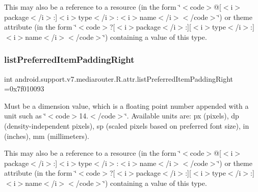 This may also be a reference to a resource (in the form \char`\"{}$<$code$>$@\mbox{[}$<$i$>$package$<$/i$>$\+:\mbox{]}$<$i$>$type$<$/i$>$\+:$<$i$>$name$<$/i$>$$<$/code$>$\char`\"{}) or theme attribute (in the form \char`\"{}$<$code$>$?\mbox{[}$<$i$>$package$<$/i$>$\+:\mbox{]}\mbox{[}$<$i$>$type$<$/i$>$\+:\mbox{]}$<$i$>$name$<$/i$>$$<$/code$>$\char`\"{}) containing a value of this type. \mbox{\label{classandroid_1_1support_1_1v7_1_1mediarouter_1_1R_1_1attr_ab8b4729519d0a70934dac6d8504e64cf}} 
\subsubsection{\texorpdfstring{list\+Preferred\+Item\+Padding\+Right}{listPreferredItemPaddingRight}}
{\footnotesize\ttfamily int android.\+support.\+v7.\+mediarouter.\+R.\+attr.\+list\+Preferred\+Item\+Padding\+Right =0x7f010093\hspace{0.3cm}{\ttfamily [static]}}

Must be a dimension value, which is a floating point number appended with a unit such as \char`\"{}$<$code$>$14.\+5sp$<$/code$>$\char`\"{}. Available units are\+: px (pixels), dp (density-\/independent pixels), sp (scaled pixels based on preferred font size), in (inches), mm (millimeters). 

This may also be a reference to a resource (in the form \char`\"{}$<$code$>$@\mbox{[}$<$i$>$package$<$/i$>$\+:\mbox{]}$<$i$>$type$<$/i$>$\+:$<$i$>$name$<$/i$>$$<$/code$>$\char`\"{}) or theme attribute (in the form \char`\"{}$<$code$>$?\mbox{[}$<$i$>$package$<$/i$>$\+:\mbox{]}\mbox{[}$<$i$>$type$<$/i$>$\+:\mbox{]}$<$i$>$name$<$/i$>$$<$/code$>$\char`\"{}) containing a value of this type. \mbox{\label{classandroid_1_1support_1_1v7_1_1mediarouter_1_1R_1_1attr_a822b5539967874c6df4234b52a556c30}} 
